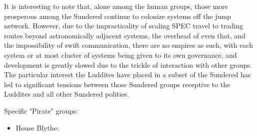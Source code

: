 It is interesting to note that, alone among the human groups, those
more prosperous among the Sundered continue to colonize systems off
the jump network. However, due to the impracticality of scaling SPEC
travel to trading routes beyond astronomically adjacent systems, the
overhead of even that, and the impossibility of swift communication,
there are no empires as such, with each system or at most cluster of
systems being given to its own governance, and development is greatly
slowed due to the trickle of interaction with other groups. The
particular interest the Luddites have placed in a subset of the
Sundered has led to significant tensions between those Sundered groups
receptive to the Luddites and all other Sundered polities.


Specific "Pirate" groups:
\begin{itemize}
\item House Blythe:


\end{itemize}

